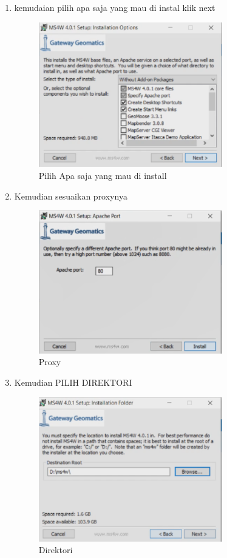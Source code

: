 \begin{enumerate}
    \item kemudaian pilih apa saja yang mau di instal klik next
    \hfill\break
	\begin{figure}[H]
		\includegraphics[width=8cm]{figures/1174034/1174034/2.PNG}
		\centering
		\caption{Pilih Apa saja yang mau di install}
	\end{figure}
	
    \item Kemudian sesuaikan proxynya 
    \hfill\break
	\begin{figure}[H]
		\includegraphics[width=8cm]{figures/1174034/1174034/3.PNG}
		\centering
		\caption{Proxy}
	\end{figure}

	 \item Kemudian PILIH DIREKTORI
    \hfill\break
	\begin{figure}[H]
		\includegraphics[width=8cm]{figures/1174034/1174034/4.PNG}
		\centering
		\caption{Direktori}
	\end{figure}
	

\end{enumerate}
